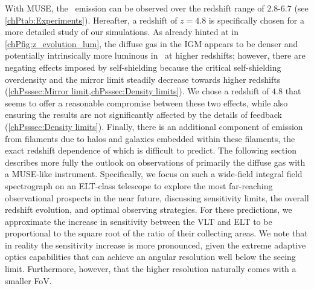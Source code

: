 With MUSE, the \lya\ emission can be observed over the redshift range of $2.8$-$6.7$ (see \cref{chPtab:Experiments}). Hereafter, a redshift of $z=4.8$ is specifically chosen for a more detailed study of our simulations. As already hinted at in \cref{chPfig:z_evolution_lum}, the diffuse gas in the IGM appears to be denser and potentially intrinsically more luminous in \lya\ at higher redshifts; however, there are negating effects imposed by self-shielding because the critical self-shielding overdensity and the mirror limit steadily decrease towards higher redshifts (\cref{chPsssec:Mirror limit,chPsssec:Density limits}). We chose a redshift of $4.8$ that seems to offer a reasonable compromise between these two effects, while also ensuring the results are not significantly affected by the details of feedback (\cref{chPsssec:Density limits}). Finally, there is an additional component of emission from filaments due to halos and galaxies embedded within these filaments, the exact redshift dependence of which is difficult to predict. The following section describes more fully the outlook on observations of primarily the diffuse gas with a MUSE-like instrument. Specifically, we focus on such a wide-field integral field spectrograph on an ELT-class telescope to explore the most far-reaching observational prospects in the near future, discussing sensitivity limits, the overall redshift evolution, and optimal observing strategies. For these predictions, we approximate the increase in sensitivity between the VLT and ELT to be proportional to the square root of the ratio of their collecting areas. We note that in reality the sensitivity increase is more pronounced, given the extreme adaptive optics capabilities that can achieve an angular resolution well below the seeing limit. Furthermore, however, that the higher resolution naturally comes with a smaller FoV.

